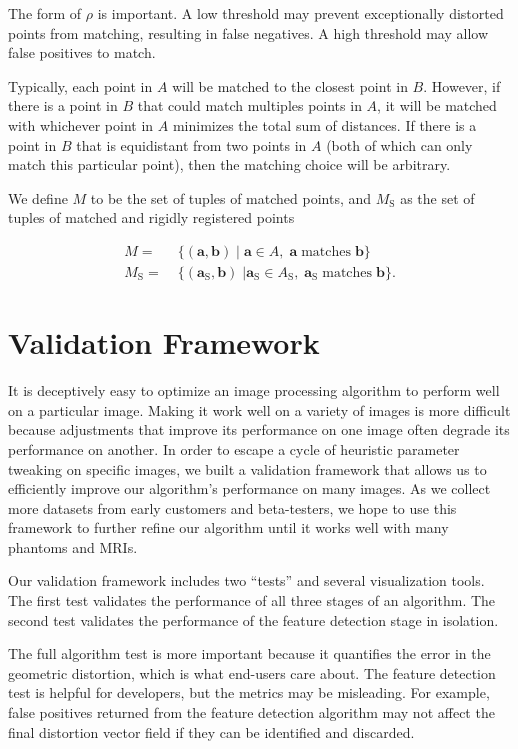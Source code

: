 \documentclass[12pt]{article}
\begin{document}
The form of $\rho$ is important.  A low threshold may prevent exceptionally distorted points from matching, resulting in false negatives.  A high threshold may allow false positives to match.

Typically, each point in $A$ will be matched to the closest point in $B$. However, if there is a point in $B$ that could match multiples points in $A$, it will be matched with whichever point in $A$ minimizes the total sum of distances.  If there is a point in $B$ that is equidistant from two points in $A$ (both of which can only match this particular point), then the matching choice will be arbitrary.

We define $M$ to be the set of tuples of matched points, and $M_\textrm{S}$ as the set of tuples of matched and rigidly registered points

\begin{align*}
    M =& \; \{ (\mathbf{a}, \mathbf{b}) \; | \; \mathbf{a} \in A, \; \mathbf{a} \; \textrm{matches} \; \mathbf{b} \} \\
    M_\textrm{S} =& \; \{ (\mathbf{a}_\textrm{S}, \mathbf{b}) \; | \mathbf{a}_\textrm{S} \in A_\textrm{S}, \; \mathbf{a}_\textrm{S} \; \textrm{matches} \; \mathbf{b} \}.
\end{align*}

\section{Validation Framework}

It is deceptively easy to optimize an image processing algorithm to perform well on a particular image. Making it work well on a variety of images is more difficult because adjustments that improve its performance on one image often degrade its performance on another.  In order to escape a cycle of heuristic parameter tweaking on specific images, we built a validation framework that allows us to efficiently improve our algorithm's performance on many images.  As we collect more datasets from early customers and beta-testers, we hope to use this framework to further refine our algorithm until it works well with many phantoms and MRIs.

Our validation framework includes two ``tests'' and several visualization tools.  The first test validates the performance of all three stages of an algorithm.  The second test validates the performance of the feature detection stage in isolation.

The full algorithm test is more important because it quantifies the error in the geometric distortion, which is what end-users care about.  The feature detection  test is helpful for developers, but the metrics may be misleading.  For example, false positives returned from the feature detection algorithm may not affect the final distortion vector field if they can be identified and discarded.
\end{document}
